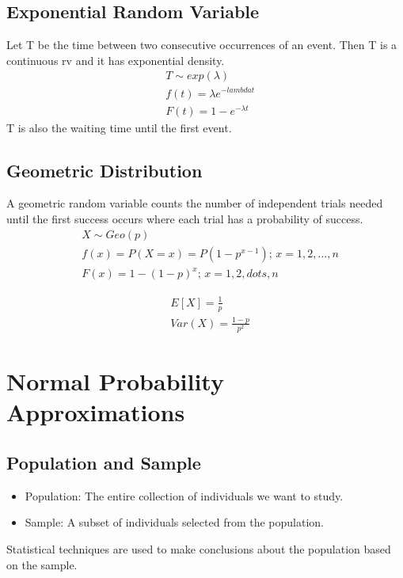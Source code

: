 \documentclass{article}
\begin{document}
    \subsection*{Exponential Random Variable}
    Let T be the time between two consecutive occurrences of an event. Then T is a continuous rv and it has exponential density.
    \begin{align*}
        &T\sim exp(\lambda)\\
        &f(t) = \lambda e^{-lambda t}\\
        &F(t) = 1-e^{-\lambda t}
    \end{align*}
    T is also the waiting time until the first event.

    \subsection*{Geometric Distribution}
    A geometric random variable counts the number of independent trials needed until the first success occurs where
    each trial has a probability of success.
    \begin{align*}
        &X\sim Geo(p)\\
        &f(x) = P(X = x) = P(1-p^{x-1}); \, x = 1, 2, \dots, n\\
        &F(x) = 1 - (1-p)^{x}; \, x = 1, 2, dots, n
    \end{align*}

    \begin{align*}
        &E[X] = \frac{1}{p}\\
        &Var(X) = \frac{1-p}{p^{2}}
    \end{align*}
    \section*{Normal Probability Approximations}
    \subsection*{Population and Sample}
    \begin{itemize}
        \item Population: The entire collection of individuals we want to study.
        \item Sample: A subset of individuals selected from the population.
    \end{itemize}

    Statistical techniques are used to make conclusions about the population 
    based on the sample.
\end{document}
